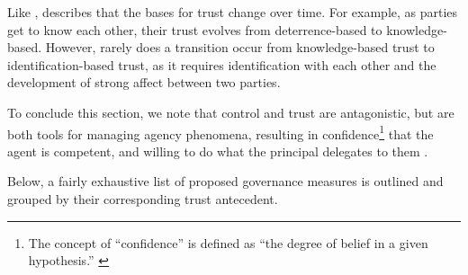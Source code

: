 \documentclass[12pt]{article}
\begin{document}
Like \citet{kirilov2012}, \citet[1011]{lewicki2006} describes that the
bases for trust change over time. For example, as parties get to know
each other, their trust evolves from deterrence-based to
knowledge-based. However, rarely does a transition occur from
knowledge-based trust to identification-based trust, as it requires
identification with each other and the development of strong affect
between two parties.

To conclude this section, we note that control and trust are
antagonistic, but are both tools for managing agency phenomena,
resulting in confidence\footnote{The concept of ``confidence'' is
  defined as ``the degree of belief in a given hypothesis.'' \citep[
  412]{tversky1992}} that the agent is competent, and willing to do what
the principal delegates to them \citep[ 802-813]{castelfranchi2000}.

Below, a fairly exhaustive list of proposed governance measures is
outlined and grouped by their corresponding trust antecedent.
\end{document}
